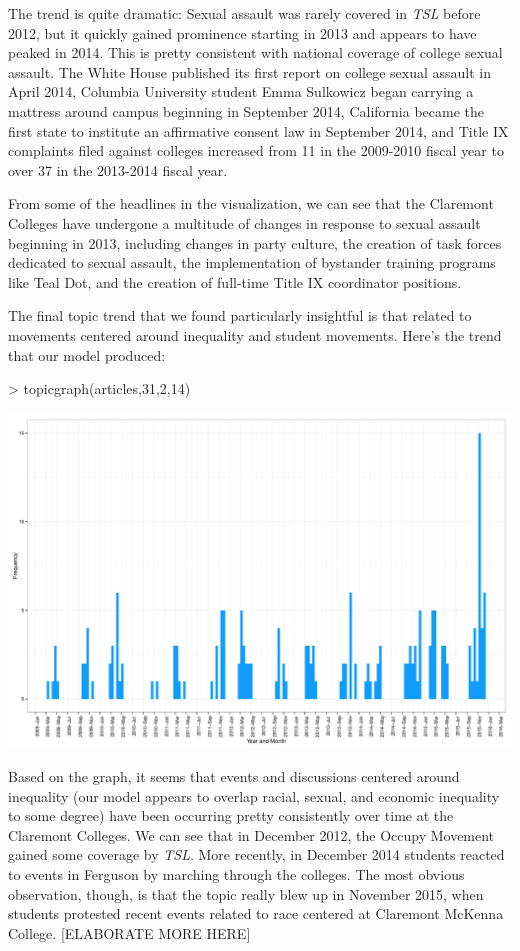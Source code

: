 \documentclass[a4paper]{article}
\begin{document}
The trend is quite dramatic: Sexual assault was rarely covered in \textit{TSL} before 2012, but it quickly gained prominence starting in 2013 and appears to have peaked in 2014. This is pretty consistent with national coverage of college sexual assault. The White House published its first report on college sexual assault in April 2014, Columbia University student Emma Sulkowicz began carrying a mattress around campus beginning in September 2014, California became the first state to institute an affirmative consent law in September 2014, and Title IX complaints filed against colleges increased from 11 in the 2009-2010 fiscal year to over 37 in the 2013-2014 fiscal year.

From some of the headlines in the visualization, we can see that the Claremont Colleges have undergone a multitude of changes in response to sexual assault beginning in 2013, including changes in party culture, the creation of task forces dedicated to sexual assault, the implementation of bystander training programs like Teal Dot, and the creation of full-time Title IX coordinator positions.

The final topic trend that we found particularly insightful is that related to movements centered around inequality and student movements. Here's the trend that our model produced:

\begin{Schunk}
\begin{Sinput}
> topicgraph(articles,31,2,14)
\end{Sinput}
\end{Schunk}
\includegraphics{FinalProject-009}

Based on the graph, it seems that events and discussions centered around inequality (our model appears to overlap racial, sexual, and economic inequality to some degree) have been occurring pretty consistently over time at the Claremont Colleges. We can see that in December 2012, the Occupy Movement gained some coverage by \textit{TSL}. More recently, in December 2014 students reacted to events in Ferguson by marching through the colleges. The most obvious observation, though, is that the topic really blew up in November 2015, when students protested recent events related to race centered at Claremont McKenna College.
[ELABORATE MORE HERE]
\end{document}
